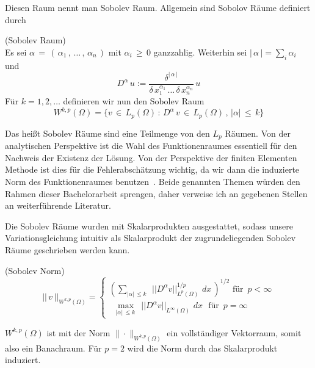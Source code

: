 Diesen Raum nennt man Sobolev Raum. Allgemein sind Sobolov Räume definiert durch

\begin{Definition} (Sobolev Raum) \\
Es sei $\alpha \, = \, ( \, \alpha_1 \, , \, \dots  \, , \, \alpha_n \, )$ mit $\alpha_i \, \geq \, 0$ ganzzahlig. Weiterhin sei $|\, \alpha \, |= \sum_i \alpha_i$ und
\begin{equation*}
D^{\alpha} \, u := \dfrac{ \delta^{| \, \alpha \,|} } {\delta \, x_1^{\alpha_1} \, \dots \, \delta \, x_n^{\alpha_n}} \, u
\end{equation*}
Für $k=1,2,\dots$ definieren wir nun den Sobolev Raum 
\begin{equation*}
W^{k,p} (\Omega) = \{ v \, \in  \, L_p (\Omega) \, : \, D^{\alpha} \, v \, \in \, L_p (\Omega) \, , \, | \alpha | \, \leq \, k \}
\end{equation*}
\end{Definition}

Das heißt Sobolev Räume sind eine Teilmenge von den $L_{p}$ Räumen.
Von der analytischen Perspektive ist die Wahl des Funktionenraumes essentiell für den Nachweis der Existenz der Lösung. Von der Perspektive der finiten Elementen Methode ist dies für die Fehlerabschätzung wichtig, da wir dann die induzierte Norm des Funktionenraumes benutzen~\cite[36]{Johnson}. Beide genannten Themen würden den Rahmen dieser Bachelorarbeit sprengen, daher verweise ich an gegebenen Stellen an weiterführende Literatur.

Die Sobolev Räume wurden mit Skalarprodukten ausgestattet, sodass unsere Variationsgleichung intuitiv als Skalarprodukt der zugrundeliegenden Sobolev Räume geschrieben werden kann.

\begin{Definition} (Sobolev Norm) \\
\begin{equation*}
|| \, v \, ||_{W^{k,p}(\Omega)} =
\begin{cases}
( \sum\limits_{|\alpha| \, \leq k \, } \, \, || D^{\alpha}v ||_{L^p(\Omega)}^{1/p} \, \, dx \, )^{1/2} \text{ für } \, p < \infty \\
 \, \, \, \max\limits_{|\alpha| \, \leq k \, } \, \, || D^{\alpha}v ||_{L^{\infty}(\Omega)} \, \, dx \,  \, \text{ für } \, p = \infty 
\end{cases}
\end{equation*}
\end{Definition}

$W^{{k,p}}(\Omega )$ ist mit der Norm $ \|{\cdot }\|_{{W^{{k,p}}(\Omega )}}$ ein vollständiger Vektorraum, somit also ein Banachraum.
Für $p=2$ wird die Norm durch das Skalarprodukt induziert.

